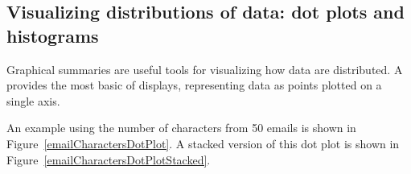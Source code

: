 \begin{doublespace}

\subsection{Visualizing distributions of data: dot plots and histograms}
\label{DotPlotsAndHistograms}

Graphical summaries are useful tools for visualizing how data are distributed. A  provides the most basic of displays, representing data as points plotted on a single axis. 

An example using the number of characters from 50 emails is shown in Figure~\ref{emailCharactersDotPlot}. A stacked version of this dot plot is shown in Figure~\ref{emailCharactersDotPlotStacked}.


\end{doublespace}
